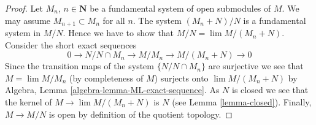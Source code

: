\documentclass{stacks-project}
\theoremstyle{plain}
\theoremstyle{definition}
\theoremstyle{remark}
\numberwithin{equation}{subsection}
\def\lim{\mathop{\mathrm{lim}}\nolimits}
\begin{document}
\begin{proof}
Let $M_n$, $n \in \mathbf{N}$ be a fundamental system of open submodules of $M$.
We may assume $M_{n + 1} \subset M_n$
for all $n$. The system $(M_n + N)/N$ is a fundamental system in $M/N$.
Hence we have to show that $M/N = \lim M/(M_n + N)$. Consider
the short exact sequences
$$
0 \to N/N \cap M_n \to M/M_n \to M/(M_n + N) \to 0
$$
Since the transition maps of the system $\{N/N\cap M_n\}$ are surjective
we see that $M = \lim M/M_n$ (by completeness of $M$) surjects onto
$\lim M/(M_n + N)$ by
Algebra, Lemma \ref{algebra-lemma-ML-exact-sequence}.
As $N$ is closed we see that the kernel of $M \to \lim M/(M_n + N)$
is $N$ (see Lemma \ref{lemma-closed}). Finally, $M \to M/N$
is open by definition of the quotient topology.
\end{proof}
\end{document}
